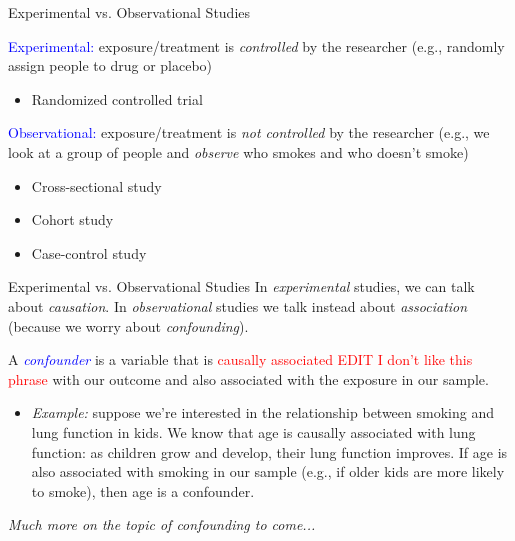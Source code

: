 \documentclass[10pt,t]{beamer}
\begin{document}
\begin{frame}{Experimental vs. Observational Studies}

\textcolor{blue}{Experimental:} exposure/treatment is \textit{controlled} by the researcher (e.g., randomly assign people to drug or placebo)
\begin{itemize}
	\item Randomized controlled trial 
\end{itemize}

\vspace{0.3cm}

\textcolor{blue}{Observational:} exposure/treatment is \textit{not controlled} by the researcher (e.g., we look at a group of people and \textit{observe} who smokes and who doesn't smoke)
\begin{itemize}
	\item Cross-sectional study
	\item Cohort study
	\item Case-control study
\end{itemize}
\end{frame}
	
	
\begin{frame}{Experimental vs. Observational Studies}
In \textit{experimental} studies, we can talk about \color{blue} \textit{causation}\color{black}. In \textit{observational} studies we  talk instead about \color{blue} \textit{association} \color{black}(because we worry about \color{blue} \textit{confounding}\color{black}). \\

\vspace{0.3cm}

A \textit{\textcolor{blue}{confounder}} is a variable that is \textcolor{red}{causally associated EDIT I don't like this phrase} with our outcome and also associated with the exposure in our sample.  \\

\vspace{0.3cm}

\begin{itemize}
	\item[] \textit{Example:} suppose we're interested in the relationship between smoking and lung function in kids. We know that age is causally associated with lung function: as children grow and develop, their lung function improves. If age is also associated with smoking in our sample (e.g., if older kids are more likely to smoke), then age is a confounder.
\end{itemize} 

\vspace{0.3cm}

\small \textit{Much more on the topic of confounding to come...} 
\end{frame}
\end{document}
